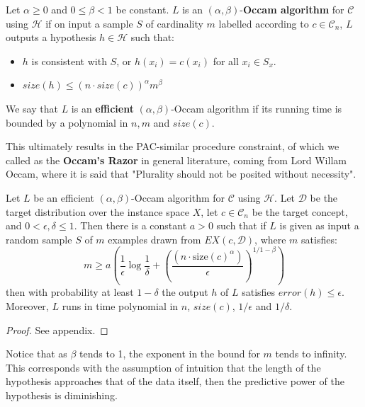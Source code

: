 \documentclass[10pt]{article}
\begin{document}
\begin{definition}
    Let $\alpha \geq 0$ and $0\leq \beta < 1$ be constant. $L$ is an $(\alpha, \beta)$-\textbf{Occam algorithm} for $\mathcal{C}$ using $\mathcal{H}$ if on input a sample $S$ of cardinality $m$ labelled according to $c\in \mathcal{C}_{n}$, $L$ outputs a hypothesis $h\in \mathcal{H}$ such that: 
    \begin{itemize}
        \item $h$ is consistent with $S$, or $h(x_{i})=c(x_i)$ for all $x_{i}\in S_{x}$. 
        \item $size(h)\leq (n\cdot size(c))^{\alpha}m^{\beta}$
    \end{itemize}
    We say that $L$ is an \textbf{efficient} $(\alpha,\beta)$-Occam algorithm if its running time is bounded by a polynomial in $n,m$ and $size(c)$.  
\end{definition}

This ultimately results in the PAC-similar procedure constraint, of which we called as the \textbf{Occam's Razor} in general literature, coming from Lord Willam Occam, where it is said that "Plurality should not be posited without necessity". 
\begin{theorem}\label{eq:Occam1}
    Let $L$ be an efficient $(\alpha,\beta)$-Occam algorithm for $\mathcal{C}$ using $\mathcal{H}$. Let $\mathcal{D}$ be the target distribution over the instance space $X$, let $c\in \mathcal{C}_{n}$ be the target concept, and $0< \epsilon, \delta \leq 1$. Then there is a constant $a>0$ such that if $L$ is given as input a random sample $S$ of $m$ examples drawn from $EX(c,\mathcal{D})$, where $m$ satisfies: 
    \begin{equation}
        m \geq a \left( \frac{1}{\epsilon} \log{\frac{1}{\delta}} + \left(\frac{(n\cdot \mathrm{size}(c)^{\alpha})}{\epsilon}\right)^{1/1-\beta} \right)
    \end{equation}
    then with probability at least $1-\delta$ the output $h$ of $L$ satisfies $error(h)\leq \epsilon$. Moreover, $L$ runs in time polynomial in $n$, $size(c)$, $1/\epsilon$ and $1/\delta$.
\end{theorem}
\begin{proof}
    See appendix.
\end{proof}
Notice that as $\beta$ tends to 1, the exponent in the bound for $m$ tends to infinity. This corresponds with the assumption of intuition that the length of the hypothesis approaches that of the data itself, then the predictive power of the hypothesis is diminishing. 
\end{document}
